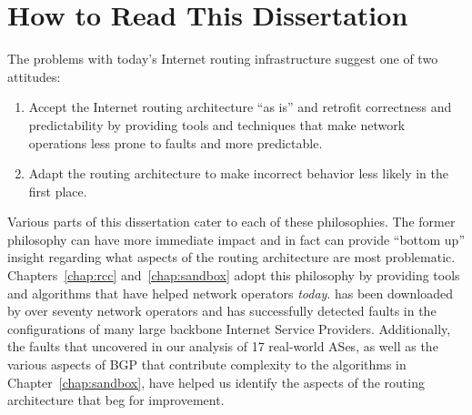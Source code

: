 





\section{How to Read This Dissertation}\label{sec:guide}

The problems with today's Internet routing infrastructure suggest one of
two attitudes:

\begin{enumerate}
\item Accept the Internet routing architecture ``as is'' and retrofit
  correctness and predictability by providing tools and techniques that
  make network operations less prone to faults and more predictable.
\item Adapt the routing architecture to make incorrect behavior
  less likely in the first place.
\end{enumerate}

Various parts of this dissertation cater to each of these philosophies.
The former philosophy can have more immediate impact and in fact can
provide ``bottom up'' insight regarding what aspects of the routing
architecture are most problematic.  Chapters~\ref{chap:rcc}
and~\ref{chap:sandbox} adopt this philosophy by providing tools and
algorithms that have helped network operators {\em today}.  \rcc has
been downloaded by over seventy network operators and has successfully
detected faults in the configurations of many large backbone Internet
Service Providers.  Additionally, the faults that \rcc uncovered in our
analysis of 17 real-world ASes, as well as the various aspects of BGP
that contribute complexity to the algorithms in
Chapter~\ref{chap:sandbox}, have helped us identify the aspects of the
routing architecture that beg for improvement.

